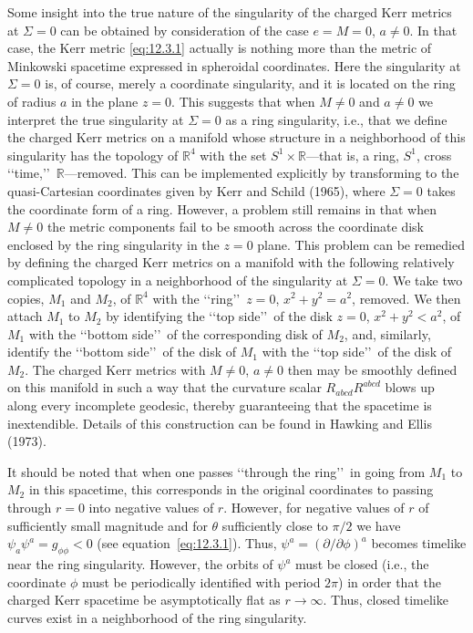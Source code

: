 Some insight into the true nature of the singularity of the charged Kerr metrics at
\(\Sigma=0\) can be obtained by consideration of the case \(e=M=0\), \(a\ne0\).
In that case, the Kerr metric \eqref{eq:12.3.1} actually is nothing more than the
metric of Minkowski spacetime expressed in spheroidal coordinates. Here the
singularity at \(\Sigma=0\) is, of course, merely a coordinate singularity, and it is
located on the ring of radius \(a\) in the plane \(z=0\). This suggests that when
\(M\ne0\) and \(a\ne0\) we interpret the true singularity at \(\Sigma=0\) as a ring
singularity, i.e., that we define the charged Kerr metrics on a manifold whose
structure in a neighborhood of this singularity has the topology of \(\mathbb R^4\)
with the set \(S^1\times\mathbb R\)---that is, a ring, \(S^1\), cross
\lq\lq time,\rq\rq\ \(\mathbb R\)---removed. This can be implemented explicitly by
transforming to the quasi-Cartesian coordinates given by Kerr and Schild (1965),
where \(\Sigma=0\) takes the coordinate form of a ring. However, a problem still
remains in that when \(M\ne0\) the metric components fail to be smooth across the
coordinate disk enclosed by the ring singularity in the \(z=0\) plane. This problem
can be remedied by defining the charged Kerr metrics on a manifold with the
following relatively complicated topology in a neighborhood of the singularity at
\(\Sigma=0\). We take two copies, \(M_1\) and \(M_2\), of \(\mathbb R^4\) with the
\lq\lq ring\rq\rq\ \(z=0\), \(x^2+y^2=a^2\), removed. We then attach \(M_1\) to
\(M_2\) by identifying the \lq\lq top side\rq\rq\ of the disk
\(z=0\), \(x^2+y^2<a^2\), of \(M_1\) with the \lq\lq bottom side\rq\rq\ of the
corresponding disk of \(M_2\), and, similarly, identify the \lq\lq bottom side\rq\rq\
of the disk of \(M_1\) with the \lq\lq top side\rq\rq\ of the disk of \(M_2\). The
charged Kerr metrics with \(M\ne0\), \(a\ne0\) then may be smoothly defined on
this manifold in such a way that the curvature scalar \(R_{abcd}R^{abcd}\) blows up
along every incomplete geodesic, thereby guaranteeing that the spacetime is
inextendible. Details of this construction can be found in Hawking and Ellis (1973).

It should be noted that when one passes \lq\lq through the ring\rq\rq\ in going from
\(M_1\) to \(M_2\) in this spacetime, this corresponds in the original coordinates to
passing through \(r=0\) into negative values of \(r\). However, for negative values
of \(r\) of sufficiently small magnitude and for \(\theta\) sufficiently close to
\(\pi/2\) we have \(\psi_a\psi^a=g_{\phi\phi}<0\) (see
equation~\eqref{eq:12.3.1}). Thus, \(\psi^a=(\partial/\partial\phi)^a\) becomes
timelike near the ring singularity. However, the orbits of \(\psi^a\) must be closed
(i.e., the coordinate \(\phi\) must be periodically identified with period \(2\pi\)) in
order that the charged Kerr spacetime be asymptotically flat as \(r\to\infty\). Thus,
closed timelike curves exist in a neighborhood of the ring singularity.

